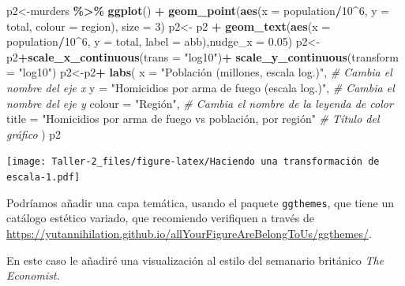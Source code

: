 \documentclass[
]{article}
\newenvironment{Shaded}{\begin{snugshade}}{\end{snugshade}}
\newcommand{\AttributeTok}[1]{\textcolor[rgb]{0.13,0.29,0.53}{#1}}
\newcommand{\CommentTok}[1]{\textcolor[rgb]{0.56,0.35,0.01}{\textit{#1}}}
\newcommand{\DecValTok}[1]{\textcolor[rgb]{0.00,0.00,0.81}{#1}}
\newcommand{\FloatTok}[1]{\textcolor[rgb]{0.00,0.00,0.81}{#1}}
\newcommand{\FunctionTok}[1]{\textcolor[rgb]{0.13,0.29,0.53}{\textbf{#1}}}
\newcommand{\NormalTok}[1]{#1}
\newcommand{\OtherTok}[1]{\textcolor[rgb]{0.56,0.35,0.01}{#1}}
\newcommand{\SpecialCharTok}[1]{\textcolor[rgb]{0.81,0.36,0.00}{\textbf{#1}}}
\newcommand{\StringTok}[1]{\textcolor[rgb]{0.31,0.60,0.02}{#1}}
\begin{document}
\begin{Shaded}
\begin{Highlighting}[]
\NormalTok{p2}\OtherTok{\textless{}{-}}\NormalTok{murders }\SpecialCharTok{\%\textgreater{}\%}
  \FunctionTok{ggplot}\NormalTok{() }\SpecialCharTok{+}
  \FunctionTok{geom\_point}\NormalTok{(}\FunctionTok{aes}\NormalTok{(}\AttributeTok{x =}\NormalTok{ population}\SpecialCharTok{/}\DecValTok{10}\SpecialCharTok{\^{}}\DecValTok{6}\NormalTok{, }\AttributeTok{y =}\NormalTok{ total, }\AttributeTok{colour =}\NormalTok{ region), }\AttributeTok{size =} \DecValTok{3}\NormalTok{)}
\NormalTok{p2}\OtherTok{\textless{}{-}}\NormalTok{ p2 }\SpecialCharTok{+} \FunctionTok{geom\_text}\NormalTok{(}\FunctionTok{aes}\NormalTok{(}\AttributeTok{x =}\NormalTok{ population}\SpecialCharTok{/}\DecValTok{10}\SpecialCharTok{\^{}}\DecValTok{6}\NormalTok{, }\AttributeTok{y =}\NormalTok{ total, }\AttributeTok{label =}\NormalTok{ abb),}\AttributeTok{nudge\_x =} \FloatTok{0.05}\NormalTok{)}
\NormalTok{p2}\OtherTok{\textless{}{-}}\NormalTok{p2}\SpecialCharTok{+}\FunctionTok{scale\_x\_continuous}\NormalTok{(}\AttributeTok{trans =} \StringTok{"log10"}\NormalTok{)}\SpecialCharTok{+}
  \FunctionTok{scale\_y\_continuous}\NormalTok{(}\AttributeTok{transform =} \StringTok{"log10"}\NormalTok{)}
\NormalTok{p2}\OtherTok{\textless{}{-}}\NormalTok{p2}\SpecialCharTok{+}
  \FunctionTok{labs}\NormalTok{(}
    \AttributeTok{x =} \StringTok{"Población (millones, escala log.)"}\NormalTok{,   }\CommentTok{\# Cambia el nombre del eje x}
    \AttributeTok{y =} \StringTok{"Homicidios por arma de fuego (escala log.)"}\NormalTok{,            }\CommentTok{\# Cambia el nombre del eje y}
    \AttributeTok{colour =} \StringTok{"Región"}\NormalTok{,              }\CommentTok{\# Cambia el nombre de la leyenda de color}
    \AttributeTok{title =} \StringTok{"Homicidios por arma de fuego vs población, por región"}  \CommentTok{\# Título del gráfico}
\NormalTok{  )}
\NormalTok{p2}
\end{Highlighting}
\end{Shaded}

\texttt{[image: Taller-2\_files/figure-latex/Haciendo una transformación de escala-1.pdf]}

Podríamos añadir una capa temática, usando el paquete \texttt{ggthemes},
que tiene un catálogo estético variado, que recomiendo verifiquen a
través de
\url{https://yutannihilation.github.io/allYourFigureAreBelongToUs/ggthemes/}.

En este caso le añadiré una visualización al estilo del semanario
británico \emph{The Economist.}
\end{document}
